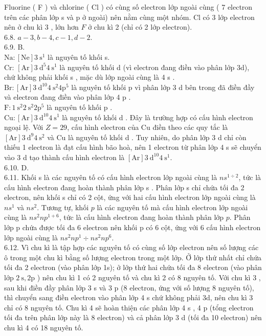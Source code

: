 \documentclass[10pt]{article}
\begin{document}
Fluorine ( F ) và chlorine ( Cl ) có cùng số electron lớp ngoài cùng ( 7 electron trên các phân lớp s và p ở ngoài) nên nằm cùng một nhóm. Cl có 3 lớp electron nên ở chu kì 3 , lớn hơn $F$ ở chu kì 2 (chỉ có 2 lớp electron).\\
6.8. $a-3, b-4, c-1, d-2$.\\
6.9. B.\\
$\mathrm{Na}:[\mathrm{Ne}] 3 \mathrm{~s}^{1}$ là nguyên tố khối s.\\
Cr: $[\mathrm{Ar}] 3 \mathrm{~d}^{5} 4 \mathrm{~s}^{1}$ là nguyên tố khối d (vì electron đang điền vào phân lớp 3d), chứ không phải khối s , mặc dù lớp ngoài cùng là 4 s .\\
$\mathrm{Br}:[\mathrm{Ar}] 3 \mathrm{~d}^{10} 4 \mathrm{~s}^{2} 4 \mathrm{p}^{5}$ là nguyên tố khối p vì phân lớp 3 d bên trong đã điền đầy và electron đang điền vào phân lớp 4 p .\\
$\mathrm{F}: 1 \mathrm{~s}^{2} 2 \mathrm{~s}^{2} 2 \mathrm{p}^{5}$ là nguyên tố khối p .\\
$\mathrm{Cu}:[\mathrm{Ar}] 3 \mathrm{~d}^{10} 4 \mathrm{~s}^{1}$ là nguyên tố khối d . Đây là trường hợp có cấu hình electron ngoại lệ. Với $Z=29$, cấu hình electron của Cu điền theo các quy tắc là $[\mathrm{Ar}] 3 \mathrm{~d}^{9} 4 \mathrm{~s}^{2}$ và Cu là nguyên tố khối d . Tuy nhiên, do phân lớp 3 d chỉ còn thiếu 1 electron là đạt cấu hình bão hoà, nên 1 electron từ phân lớp 4 s sẽ chuyển vào 3 d tạo thành cấu hình electron là $[\mathrm{Ar}] 3 \mathrm{~d}^{10} 4 \mathrm{~s}^{1}$.\\
6.10. D.\\
6.11. Khối s là các nguyên tố có cấu hình electron lớp ngoài cùng là $n s^{1 \div 2}$, tức là cấu hình electron đang hoàn thành phân lớp s . Phân lớp s chỉ chứa tối đa 2 electron, nên khối s chỉ có 2 cột, ứng với hai cấu hình electron lớp ngoài cùng là $n s^{1}$ và $n s^{2}$. Tương tự, khối $p$ là các nguyên tố mà cấu hình electron lớp ngoài cùng là $n s^{2} n p^{1+6}$, tức là cấu hình electron đang hoàn thành phân lớp $p$. Phân lớp p chứa được tối đa 6 electron nên khối p có 6 cột, ứng với 6 cấu hình electron lớp ngoài cùng là $n s^{2} n p^{1} \div n s^{2} n p^{6}$.\\
6.12. Vì chu kì là tập hợp các nguyên tố có cùng số lớp electron nên số lượng các ô trong một chu kì bằng số lượng electron trong một lớp. Ở lớp thứ nhất chỉ chứa tối đa 2 electron (vào phân lớp 1s); ở lớp thứ hai chứa tối đa 8 electron (vào phân lớp $2 \mathrm{~s}, 2 \mathrm{p}$ ) nên chu kì 1 có 2 nguyên tố và chu kì 2 có 8 nguyên tố. Với chu kì 3 , sau khi điền đầy phân lớp 3 s và 3 p (8 electron, ứng với số lượng 8 nguyên tố), thì chuyển sang điền electron vào phân lớp 4 s chứ không phải 3d, nên chu kì 3 chỉ có 8 nguyên tố. Chu kì 4 sẽ hoàn thiện các phân lớp 4 s , 4 p (tổng electron tối đa trên phân lớp này là 8 electron) và cả phân lớp 3 d (tối đa 10 electron) nên chu kì 4 có 18 nguyên tố.\\
\end{document}
